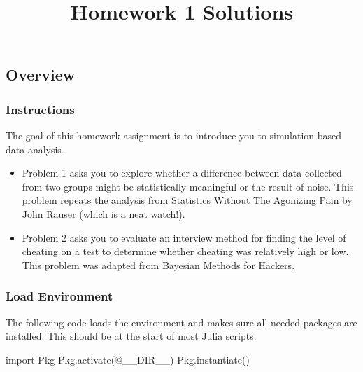 \documentclass[
  letterpaper,
  DIV=11,
  numbers=noendperiod]{scrartcl}
\title{Homework 1 Solutions}
\author{}
\date{}
\newenvironment{Shaded}{\begin{snugshade}}{\end{snugshade}}
\newcommand{\BuiltInTok}[1]{\textcolor[rgb]{0.00,0.23,0.31}{#1}}
\newcommand{\FunctionTok}[1]{\textcolor[rgb]{0.28,0.35,0.67}{#1}}
\newcommand{\ImportTok}[1]{\textcolor[rgb]{0.00,0.46,0.62}{#1}}
\newcommand{\NormalTok}[1]{\textcolor[rgb]{0.00,0.23,0.31}{#1}}
\newcommand{\PreprocessorTok}[1]{\textcolor[rgb]{0.68,0.00,0.00}{#1}}
\providecommand{\tightlist}{%
  \setlength{\itemsep}{0pt}\setlength{\parskip}{0pt}}\usepackage{longtable,booktabs,array}
\begin{document}
\maketitle
{}

\subsection{Overview}\label{overview}

\subsubsection{Instructions}\label{instructions}

The goal of this homework assignment is to introduce you to
simulation-based data analysis.

\begin{itemize}
\tightlist
\item
  Problem 1 asks you to explore whether a difference between data
  collected from two groups might be statistically meaningful or the
  result of noise. This problem repeats the analysis from
  \href{https://www.youtube.com/watch?v=5Dnw46eC-0o}{Statistics Without
  The Agonizing Pain} by John Rauser (which is a neat watch!).
\item
  Problem 2 asks you to evaluate an interview method for finding the
  level of cheating on a test to determine whether cheating was
  relatively high or low. This problem was adapted from
  \href{https://dataorigami.net/Probabilistic-Programming-and-Bayesian-Methods-for-Hackers/}{Bayesian
  Methods for Hackers}.
\end{itemize}

\subsubsection{Load Environment}\label{load-environment}

The following code loads the environment and makes sure all needed
packages are installed. This should be at the start of most Julia
scripts.

\begin{Shaded}
\begin{Highlighting}[]
\ImportTok{import} \BuiltInTok{Pkg}
\BuiltInTok{Pkg}\NormalTok{.}\FunctionTok{activate}\NormalTok{(}\PreprocessorTok{@\_\_DIR\_\_}\NormalTok{)}
\BuiltInTok{Pkg}\NormalTok{.}\FunctionTok{instantiate}\NormalTok{()}
\end{Highlighting}
\end{Shaded}
\end{document}
